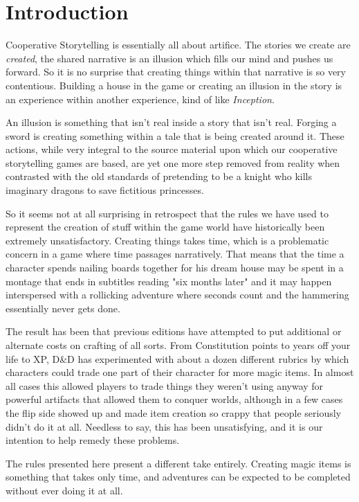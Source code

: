 \section{Introduction}

Cooperative Storytelling is essentially all about artifice. The stories we create are \textit{created}, the shared narrative is an illusion which fills our mind and pushes us forward. So it is no surprise that creating things within that narrative is so very contentious. Building a house in the game or creating an illusion in the story is an experience within another experience, kind of like \textit{Inception}.

An illusion is something that isn't real inside a story that isn't real. Forging a sword is creating something within a tale that is being created around it. These actions, while very integral to the source material upon which our cooperative storytelling games are based, are yet one more step removed from reality when contrasted with the old standards of pretending to be a knight who kills imaginary dragons to save fictitious princesses.

So it seems not at all surprising in retrospect that the rules we have used to represent the creation of stuff within the game world have historically been extremely unsatisfactory. Creating things takes time, which is a problematic concern in a game where time passages narratively. That means that the time a character spends nailing boards together for his dream house may be spent in a montage that ends in subtitles reading "six months later" and it may happen interspersed with a rollicking adventure where seconds count and the hammering essentially never gets done.

The result has been that previous editions have attempted to put additional or alternate costs on crafting of all sorts. From Constitution points to years off your life to XP, D\&D has experimented with about a dozen different rubrics by which characters could trade one part of their character for more magic items. In almost all cases this allowed players to trade things they weren't using anyway for powerful artifacts that allowed them to conquer worlds, although in a few cases the flip side showed up and made item creation so crappy that people seriously didn't do it at all. Needless to say, this has been unsatisfying, and it is our intention to help remedy these problems.

The rules presented here present a different take entirely. Creating magic items is something that takes only time, and adventures can be expected to be completed without ever doing it at all.

